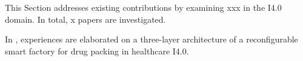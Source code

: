 This Section addresses existing contributions by examining xxx in the I4.0 domain. 
In total, x papers are investigated. 

In \cite{MyRef}, experiences are elaborated on a three-layer architecture of a reconfigurable smart factory for drug packing in healthcare I4.0. 




